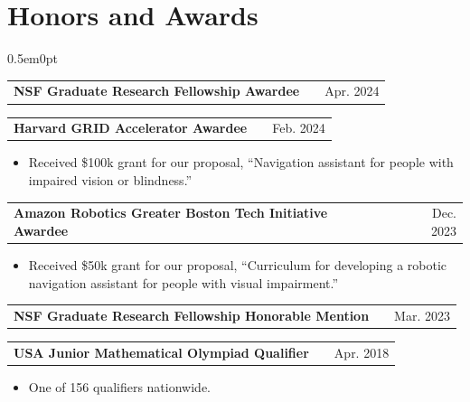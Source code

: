 \documentclass[letterpaper,11pt]{article}
\makeatletter
\newenvironment{jobshort}[2]
    {
    \begin{tabularx}{\linewidth}{@{}l X r@{}}
    \textbf{#1} & \hfill &  #2 \\[3.75pt]
    \end{tabularx}
    }
    {
    }
\newenvironment{joblong}[2]
    {
    \begin{tabularx}{\linewidth}{@{}l X r@{}}
    \textbf{#1} & \hfill &  #2 \\[3pt]
    \end{tabularx}
    \begin{minipage}[t]{\linewidth}
    \begin{itemize}[nosep,after=\strut, leftmargin=2em, itemsep=3pt,label=--]
    }
    {
    \end{itemize}
    \end{minipage}
    }
\makeatother
\begin{document}
\vspace{-22pt}
\section{Honors and Awards}
\begin{adjustwidth}{0.5em}{0pt}

\begin{jobshort}{NSF Graduate Research Fellowship Awardee}{Apr. 2024}
\end{jobshort}
\begin{joblong}{Harvard GRID Accelerator Awardee}{Feb. 2024}
    \item Received \$100k grant for our proposal, “Navigation assistant for people with impaired vision or blindness.”
\end{joblong}
\begin{joblong}{Amazon Robotics Greater Boston Tech Initiative Awardee}{Dec. 2023}
    \item Received \$50k grant for our proposal, “Curriculum for developing a robotic navigation assistant for people with visual impairment.” 
\end{joblong}
\begin{jobshort}{NSF Graduate Research Fellowship Honorable Mention}{Mar. 2023}
\end{jobshort}
\begin{joblong}{USA Junior Mathematical Olympiad Qualifier}{Apr. 2018}
    \item One of 156 qualifiers nationwide.
\end{joblong}
\end{adjustwidth}
\end{document}
